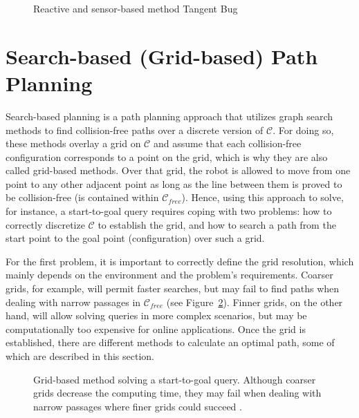 \begin{figure}[htbp]
    \myfloatalign
     \quad
\caption[Reactive and sensor-based method Tangent Bug.]
{Reactive and sensor-based method Tangent Bug}
\label{fig:TangentBug}
\end{figure}

\section{Search-based (Grid-based) Path Planning}
\label{sec:SearchBased}

Search-based planning is a path planning approach that utilizes graph search
methods to find collision-free paths over a discrete version of $\mathcal{C}$.
For doing so, these methods overlay a grid on $\mathcal{C}$ and assume that each
collision-free configuration corresponds to a point on the grid, which is why
they are also called grid-based methods. Over that grid, the robot is allowed to
move from one point to any other adjacent point as long as the line between them
is proved to be collision-free (\ie is contained within $\mathcal{C}_{free}$).
Hence, using this approach to solve, for instance, a start-to-goal query
requires coping with two problems: how to correctly discretize $\mathcal{C}$ to
establish the grid, and how to search a path from the start point to the goal
point (configuration) over such a grid.

For the first problem, it is important to correctly define the grid resolution,
which mainly depends on the environment and the problem's requirements. Coarser
grids, for example, will permit faster searches, but may fail to find paths when
dealing with narrow passages in $\mathcal{C}_{free}$ (see
Figure~\ref{fig:Grid-based}). Finner grids, on the other hand, will allow
solving queries in more complex scenarios, but may be computationally too
expensive for online applications. Once the grid is established, there are
different methods to calculate an optimal path, some of which are described in
this section.

\begin{figure}[htbp]
    \myfloatalign
     \quad
\caption[Grid-based method: coarse and fine grid.]
{Grid-based method solving a start-to-goal query.
\protect {} Although coarser grids
decrease the computing time, they may fail when dealing with narrow passages
where finer grids could succeed \protect
{}.}
\label{fig:Grid-based}
\end{figure}

